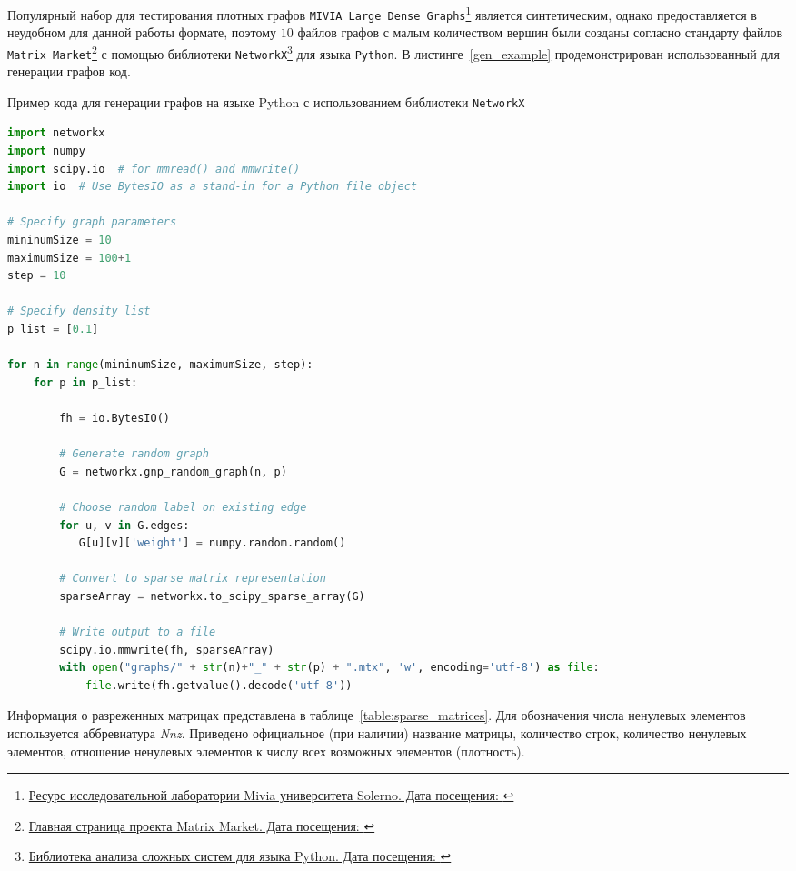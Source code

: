 Популярный набор для тестирования плотных графов \texttt{MIVIA Large Dense Graphs}\footnote{\href{https://mivia.unisa.it/datasets/graph-database/mivia2-graph-database/}{Ресурс исследовательной лаборатории Mivia университета Solerno. Дата посещения: }} является синтетическим, однако предоставляется в неудобном для данной работы формате, поэтому $10$ файлов графов с малым количеством вершин были созданы согласно стандарту файлов \texttt{Matrix Market}\footnote{\href{https://math.nist.gov/MatrixMarket/}{Главная страница проекта Matrix Market. Дата посещения: }} с помощью библиотеки \texttt{NetworkX}\footnote{\href{https://networkx.org/}{Библиотека анализа сложных систем для языка Python. Дата посещения: }} для языка \texttt{Python}. В листинге~\ref{gen_example} продемонстрирован использованный для генерации графов код.

\begin{algorithm}
\caption{Пример кода для генерации графов на языке Python с использованием библиотеки \texttt{NetworkX}}
\label{gen_example}
\begin{lstlisting}[language=python]
import networkx
import numpy
import scipy.io  # for mmread() and mmwrite()
import io  # Use BytesIO as a stand-in for a Python file object

# Specify graph parameters
mininumSize = 10
maximumSize = 100+1
step = 10

# Specify density list
p_list = [0.1]

for n in range(mininumSize, maximumSize, step):
    for p in p_list:

        fh = io.BytesIO()

        # Generate random graph
        G = networkx.gnp_random_graph(n, p)

        # Choose random label on existing edge 
        for u, v in G.edges:
           G[u][v]['weight'] = numpy.random.random()

        # Convert to sparse matrix representation
        sparseArray = networkx.to_scipy_sparse_array(G)

        # Write output to a file
        scipy.io.mmwrite(fh, sparseArray)
        with open("graphs/" + str(n)+"_" + str(p) + ".mtx", 'w', encoding='utf-8') as file:
            file.write(fh.getvalue().decode('utf-8'))
\end{lstlisting}
\end{algorithm}


Информация о разреженных матрицах представлена в таблице~\ref{table:sparse_matrices}. Для обозначения числа ненулевых элементов используется аббревиатура \textit{Nnz}. Приведено официальное (при наличии) название матрицы, количество строк, количество ненулевых элементов, отношение ненулевых элементов к числу всех возможных элементов (плотность).


